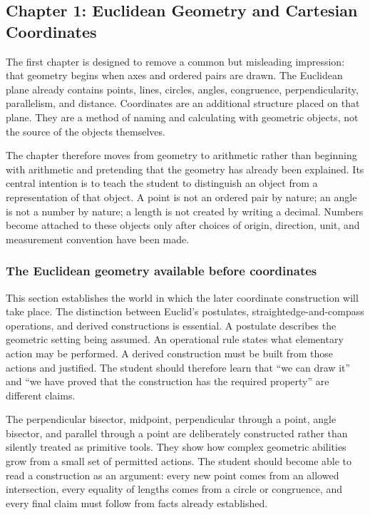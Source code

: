 \subsection*{Chapter 1: Euclidean Geometry and Cartesian Coordinates}

The first chapter is designed to remove a common but misleading impression: that
geometry begins when axes and ordered pairs are drawn. The Euclidean plane already
contains points, lines, circles, angles, congruence, perpendicularity,
parallelism, and distance. Coordinates are an additional structure placed on
that plane. They are a method of naming and calculating with geometric objects,
not the source of the objects themselves.

The chapter therefore moves from geometry to arithmetic rather than beginning
with arithmetic and pretending that the geometry has already been explained. Its
central intention is to teach the student to distinguish an object from a
representation of that object. A point is not an ordered pair by nature; an angle
is not a number by nature; a length is not created by writing a decimal. Numbers
become attached to these objects only after choices of origin, direction, unit,
and measurement convention have been made.

\subsubsection*{The Euclidean geometry available before coordinates}

This section establishes the world in which the later coordinate construction
will take place. The distinction between Euclid's postulates,
straightedge-and-compass operations, and derived constructions is essential. A
postulate describes the geometric setting being assumed. An operational rule
states what elementary action may be performed. A derived construction must be
built from those actions and justified. The student should therefore learn that
``we can draw it'' and ``we have proved that the construction has the required
property'' are different claims.

The perpendicular bisector, midpoint, perpendicular through a point, angle
bisector, and parallel through a point are deliberately constructed rather than
silently treated as primitive tools. They show how complex geometric abilities
grow from a small set of permitted actions. The student should become able to
read a construction as an argument: every new point comes from an allowed
intersection, every equality of lengths comes from a circle or congruence, and
every final claim must follow from facts already established.

